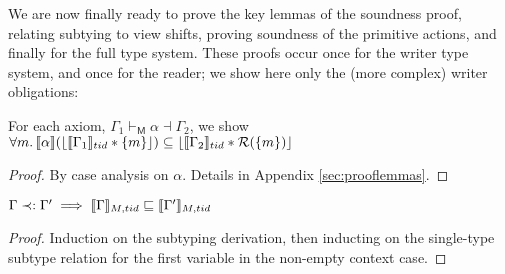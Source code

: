 We are now finally ready to prove the key lemmas of the soundness proof, relating subtying to view shifts, proving soundness of the primitive actions, and finally for the full type system.  These proofs occur once for the writer type system, and once for the reader; we show here only the (more complex) writer obligations:

\begin{lemma}
  \label{lem:axmsoundness}
For each axiom, $\Gamma_{1} \vdash_{\textsf{M}} \alpha \dashv \Gamma_{2}$, we show
$
\forall m\ldotp   \llbracket \alpha \rrbracket  (\lfloor \llbracket \Gamma_{1} \rrbracket_{tid}  * \{m\} \rfloor )\subseteq  \lfloor \llbracket \Gamma_{2} \rrbracket_{tid} * \mathcal{R}(\{m\}) \rfloor
$
\end{lemma}
\begin{proof}
By case analysis on $\alpha$. Details in Appendix \ref{sec:prooflemmas}. %
\end{proof}
\begin{lemma}\label{lem:cntxsubt-mcln}
$ \Gamma \prec: \Gamma'  \implies \llbracket \Gamma \rrbracket_{M,tid} \sqsubseteq \llbracket  \Gamma' \rrbracket_{M,tid} $
\end{lemma}
\begin{proof}
Induction on the subtyping derivation, then inducting on the single-type subtype relation for the first variable in the non-empty context case.
\end{proof}

